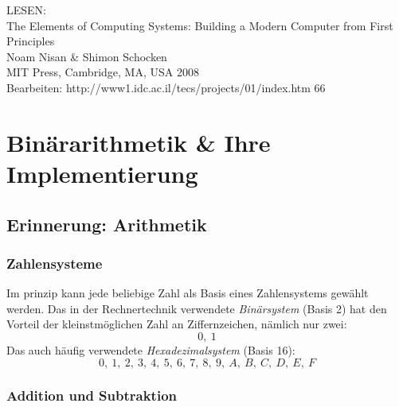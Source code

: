 \documentclass[12pt]{report}
\begin{document}
LESEN:\\
The Elements of Computing Systems: Building a Modern Computer from First Principles\\
Noam Nisan \& Shimon Schocken\\
MIT Press, Cambridge, MA, USA 2008\\
Bearbeiten: http://www1.idc.ac.il/tecs/projects/01/index.htm
66\\

\chapter{Binärarithmetik \& Ihre Implementierung}
\section{Erinnerung: Arithmetik}
\subsection{Zahlensysteme}
Im prinzip kann jede beliebige Zahl als Basis eines Zahlensystems gewählt werden.
Das in der Rechnertechnik verwendete \textit{Binärsystem} (Basis 2) hat den Vorteil der kleinstmöglichen Zahl an Ziffernzeichen, nämlich nur zwei:
$$0,\ 1$$
Das auch häufig verwendete \textit{Hexadezimalsystem} (Basis 16):
$$0,\ 1,\ 2,\ 3,\ 4,\ 5,\ 6,\ 7,\ 8,\ 9,\ A,\ B,\ C,\ D,\ E,\ F$$

\subsection{Addition und Subtraktion}
\end{document}
